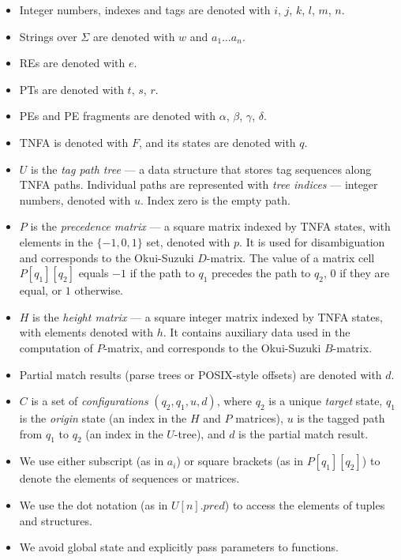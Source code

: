 \documentclass[AMA,STIX1COL]{WileyNJD-v2}
\begin{document}
\begin{itemize}[itemsep=0.2em, topsep=0.5em]
    \item Integer numbers, indexes and tags are denoted with $i$, $j$, $k$, $l$, $m$, $n$.

    \item Strings over $\Sigma$ are denoted with $w$ and $a_1 \hdots a_n$.

    \item REs are denoted with $e$.

    \item PTs are denoted with $t$, $s$, $r$.

    \item PEs and PE fragments are denoted with $\alpha$, $\beta$, $\gamma$, $\delta$.

    \item TNFA is denoted with $F$, and its states are denoted with $q$.

    \item $U$ is the \emph{tag path tree} --- a data structure that stores tag sequences along TNFA paths.
        Individual paths are represented with \emph{tree indices} --- integer numbers, denoted with $u$.
        Index zero is the empty path.

    \item $P$ is the \emph{precedence matrix} --- a square matrix indexed by TNFA states,
        with elements in the $\{-1, 0, 1\}$ set, denoted with $p$.
        It is used for disambiguation and corresponds to the Okui-Suzuki $D$-matrix.
        The value of a matrix cell $P[q_1][q_2]$ equals $-1$ if the path to $q_1$
        precedes the path to $q_2$, $0$ if they are equal, or $1$ otherwise.

    \item $H$ is the \emph{height matrix} --- a square integer matrix indexed by TNFA states,
        with elements denoted with $h$.
        It contains auxiliary data used in the computation of $P$-matrix,
        and corresponds to the Okui-Suzuki $B$-matrix.

    \item Partial match results (parse trees or POSIX-style offsets) are denoted with $d$.

    \item $C$ is a set of \emph{configurations} $(q_2, q_1, u, d)$,
        where $q_2$ is a unique \emph{target} state,
        $q_1$ is the \emph{origin} state (an index in the $H$ and $P$ matrices),
        $u$ is the tagged path from $q_1$ to $q_2$ (an index in the $U$-tree),
        and $d$ is the partial match result.

    \item We use either subscript (as in $a_i$) or square brackets (as in $P[q_1][q_2]$) to denote the elements of sequences or matrices.

    \item We use the dot notation (as in $U[n].pred$) to access the elements of tuples and structures.

    \item We avoid global state and explicitly pass parameters to functions.
    \\[-0.5em]
\end{itemize}
\end{document}
